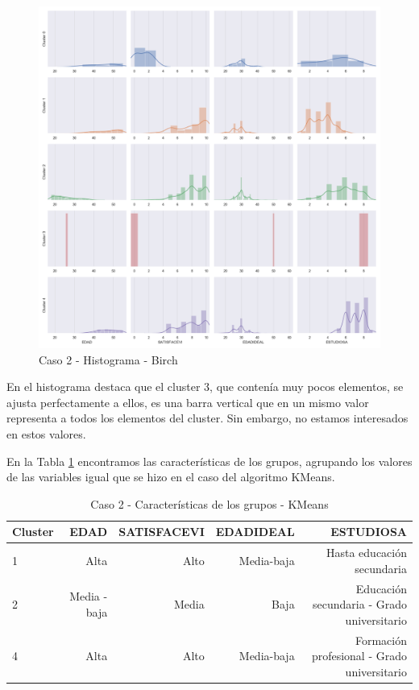 \documentclass[a4paper, 20pt]{article}
\begin{document}
\begin{figure}[H]
    \centering
    \includegraphics[width=1\textwidth]{./caso2/Birch_distplot}
    \caption{Caso 2 - Histograma - Birch}
    \label{fig:birch_dist2}
\end{figure}

En el histograma destaca que el cluster 3, que contenía muy pocos elementos, se ajusta perfectamente a ellos, es una barra vertical que en un mismo valor representa a todos los elementos del cluster. Sin embargo, no estamos interesados en estos valores.

En la Tabla \ref{tab:birch_carac2} encontramos las características de los grupos, agrupando los valores de las variables igual que se hizo en el caso del algoritmo KMeans.

\begin{table}[H]
\centering
\caption{Caso 2 - Características de los grupos - KMeans}
\label{tab:birch_carac2}
\begin{tabular}{lrrrr}
\toprule
Cluster & EDAD & SATISFACEVI & EDADIDEAL & ESTUDIOSA\\
\midrule
1 & Alta & Alto & Media-baja & Hasta educación secundaria \\
2 & Media - baja & Media & Baja & Educación secundaria - Grado universitario \\
4 & Alta & Alto & Media-baja & Formación profesional - Grado universitario \\
\bottomrule
\end{tabular}
\end{table}
\end{document}
